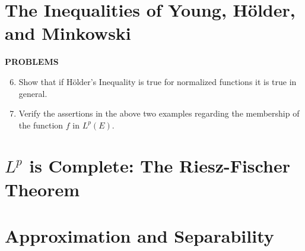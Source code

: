 \section{The Inequalities of Young, H\"older, and Minkowski}

\begin{center}
	\textbf{PROBLEMS}
\end{center}
\begin{enumerate}
	\setcounter{enumi}{5}
	\item Show that if H\"older's Inequality is true for normalized functions it is true in general.
	\item Verify the assertions in the above two examples regarding the membership of the function $f$ in $L^p(E)$. 
\end{enumerate}

\section{$L^p$ is Complete: The Riesz-Fischer Theorem}

\section{Approximation and Separability}
